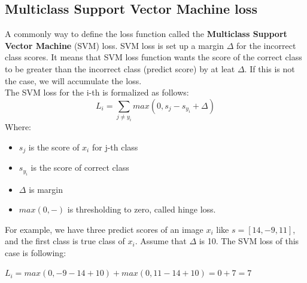 \subsection{Multiclass Support Vector Machine loss}
A commonly way to define the loss function called the \textbf{Multiclass Support Vector Machine} (SVM) loss. SVM loss is set up a margin $\Delta$ for the incorrect class scores. It means that SVM loss function wants the score of the correct class to be greater than the incorrect class (predict score) by at leat $\Delta$. If this is not the case, we will accumulate the loss.\\[0.2cm]
The SVM loss for the i-th is formalized as follows:
\begin{equation}
	L_i = \sum_{j \neq y_i }max(0,s_j - s_{y_i} + \Delta)
\end{equation}
Where:
\begin{itemize}
	\item $s_j$ is the score of $x_i$ for j-th class
	\item $s_{y_i}$ is the score of correct class
	\item $\Delta$ is margin 
	\item $max(0,-)$ is thresholding to zero, called hinge loss.
\end{itemize}
For example, we have three predict scores of an image $x_i$ like \textbf{$s = [14,-9,11]$}, and the first class is true class of $x_i$. Assume that $\Delta$ is 10. The SVM loss of this case is following:
\begin{center}
$
	L_i = max(0,-9 - 14 + 10) + max (0,11 - 14 + 10) = 0 + 7 = 7
$
\end{center}
